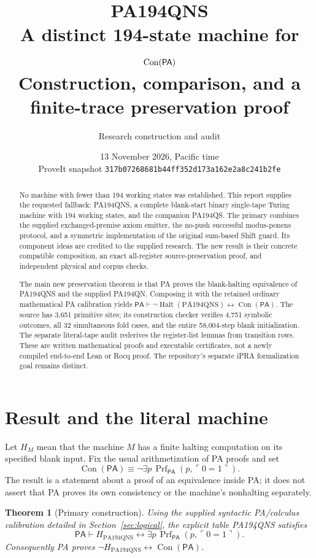\documentclass[11pt,letterpaper]{article}
\title{\textcolor{inkblue}{PA194QNS}\\[4pt]
 A distinct 194-state machine for $\Con(\PA)$\\[8pt]
 \large Construction, comparison, and a finite-trace preservation proof}
\author{Research construction and audit}
\date{13 November 2026, Pacific time\\[3pt]
 \small ProveIt snapshot \texttt{317b07268681b44ff352d173a162e2a8c241b2fe}}
\newtheorem{theorem}{Theorem}[section]
\newcommand{\PA}{\mathsf{PA}}
\newcommand{\Con}{\operatorname{Con}}
\newcommand{\Halt}{\operatorname{Halt}}
\newcommand{\Prf}{\operatorname{Prf}}
\begin{document}
\maketitle
\begin{abstract}
No machine with fewer than 194 working states was established. This report
supplies the requested fallback: PA194QNS, a complete blank-start binary
single-tape Turing machine with 194 working states, and the companion PA194QS.
The primary combines the supplied exchanged-premise axiom emitter, the
no-push successful modus-ponens protocol, and a symmetric implementation of
the original sum-based Shift guard. Its component ideas are credited to the
supplied research. The new result is their concrete compatible composition,
an exact all-register source-preservation proof, and independent physical
and corpus checks.

The main new preservation theorem is that PA proves the blank-halting
equivalence of PA194QNS and the supplied PA194QN. Composing it with the
retained ordinary mathematical PA calibration yields
$\PA\vdash\neg\Halt(\mathrm{PA194QNS})\leftrightarrow\Con(\PA)$.
The source has 3,651 primitive sites; its construction checker verifies
4,751 symbolic outcomes, all 32 simultaneous fold cases, and the entire
58,004-step blank initialization. The separate literal-tape audit rederives
the register-list lemmas from transition rows. These are written mathematical
proofs and executable certificates, not a newly compiled end-to-end Lean or
Rocq proof. The repository's separate iPRA formalization goal remains distinct.
\end{abstract}
\newpage
\tableofcontents
\newpage

\section{Result and the literal machine}

Let $H_M$ mean that the machine $M$ has a finite halting computation on its
specified blank input. Fix the usual arithmetization of PA proofs and set
\[
 \Con(\PA)\equiv\neg\exists p\,\Prf_{\PA}(p,\ulcorner0=1\urcorner).
\]
The result is a statement about a proof of an equivalence inside PA; it
does not assert that PA proves its own consistency or the machine's
nonhalting separately.

\begin{theorem}[Primary construction]
Using the supplied syntactic PA/calculus calibration detailed in
Section~\ref{sec:logical}, the explicit table PA194QNS satisfies
\[
 \PA\vdash H_{\mathrm{PA194QNS}}
 \leftrightarrow\exists p\,\Prf_{\PA}(p,\ulcorner0=1\urcorner).
\]
Consequently PA proves
$\neg H_{\mathrm{PA194QNS}}\leftrightarrow\Con(\PA)$.
\end{theorem}
\end{document}

